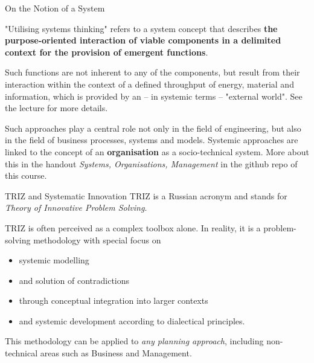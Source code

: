 \documentclass{beamer}
\begin{document}
\begin{frame}{On the Notion of a System}

"Utilising systems thinking" refers to a system concept that describes
  \textbf{the purpose-oriented interaction of viable components in a delimited
    context for the provision of emergent functions}.

Such functions are not inherent to any of the components, but result from
their interaction within the context of a defined throughput of energy,
material and information, which is provided by an -- in systemic terms --
"external world".  See the lecture for more details.

Such approaches play a central role not only in the field of engineering, but
also in the field of business processes, systems and models. Systemic
approaches are linked to the concept of an \textbf{organisation} as a
socio-technical system. More about this in the handout \emph{Systems,
  Organisations, Management} in the github repo of this course.
\end{frame}

\begin{frame}{TRIZ and Systematic Innovation}
TRIZ is a Russian acronym and stands for \emph{Theory of Innovative Problem
  Solving}.

TRIZ is often perceived as a complex toolbox alone. In reality, it is a
problem-solving methodology with special focus on
\begin{itemize}
\item systemic modelling 
\item and solution of contradictions 
\item through conceptual integration into larger contexts
\item and systemic development according to dialectical principles.
\end{itemize}
This methodology can be applied to \emph{any planning approach}, including
non-technical areas such as Business and Management.
\end{frame}
\end{document}
